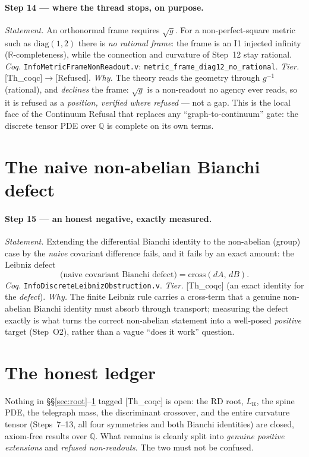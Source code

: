 \documentclass[10pt,twocolumn]{article}
\theoremstyle{definition}
\newcommand{\Thq}{\textsf{[Th\_coqc]}}   %
\newcommand{\Refu}{\textsf{[Refused]}}    %
\newcommand{\code}[1]{\texttt{#1}}
\newcommand{\LR}{L_{\mathrm R}}
\begin{document}
\paragraph{Step 14 --- where the thread stops, on purpose.}
\emph{Statement.} An orthonormal frame requires $\sqrt{g}$. For a non-perfect-square
metric such as $\mathrm{diag}(1,2)$ there is \emph{no rational frame}: the frame
is an I1 injected infinity ($\mathbb{R}$-completeness), while the connection and
curvature of Step~12 stay rational. \emph{Coq.}
\code{InfoMetricFrameNonReadout.v}: \code{metric\_frame\_diag12\_no\_rational}.
\emph{Tier.} \Thq{}$\to$\Refu{}. \emph{Why.} The theory reads the geometry
through $g^{-1}$ (rational), and \emph{declines} the frame: $\sqrt{g}$ is a
non-readout no agency ever reads, so it is refused as a \emph{position, verified
where refused} --- not a gap. This is the local face of the Continuum Refusal
that replaces any ``graph-to-continuum'' gate: the discrete tensor PDE over
$\mathbb{Q}$ is complete on its own terms.

\section{The naive non-abelian Bianchi defect}\label{sec:defect}
\paragraph{Step 15 --- an honest negative, exactly measured.}
\emph{Statement.} Extending the differential Bianchi identity to the non-abelian
(group) case by the \emph{naive} covariant difference fails, and it fails by an
exact amount: the Leibniz defect
\[
  \text{(naive covariant Bianchi defect)}=\mathrm{cross}(dA,\,dB).
\]
\emph{Coq.} \code{InfoDiscreteLeibnizObstruction.v}. \emph{Tier.} \Thq{}
(an exact identity for the \emph{defect}). \emph{Why.} The finite Leibniz rule
carries a cross-term that a genuine non-abelian Bianchi identity must absorb
through transport; measuring the defect exactly is what turns the correct
non-abelian statement into a well-posed \emph{positive} target (Step~O2), rather
than a vague ``does it work'' question.

\section{The honest ledger}\label{sec:ledger}
Nothing in \S\S\ref{sec:root}--\ref{sec:defect} tagged \Thq{} is open: the RD
root, $\LR$, the spine PDE, the telegraph mass, the discriminant crossover, and
the entire curvature tensor (Steps~7--13, all four symmetries and both Bianchi
identities) are closed, axiom-free results over $\mathbb{Q}$. What remains is
cleanly split into \emph{genuine positive extensions} and \emph{refused
non-readouts}. The two must not be confused.
\end{document}

